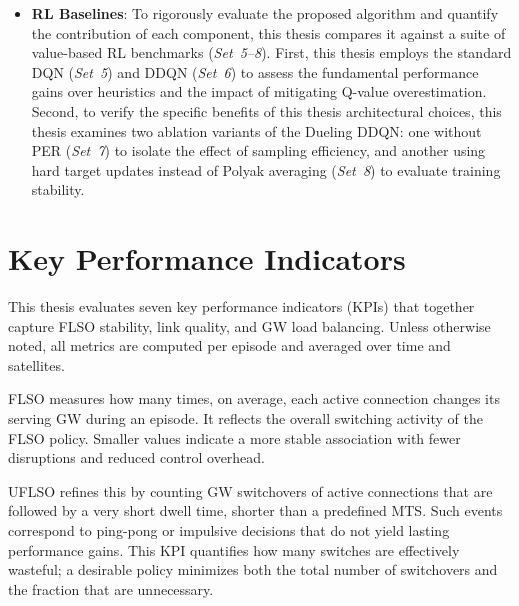 \begin{itemize}
    \item \textbf{RL Baselines}: To rigorously evaluate the proposed algorithm and quantify the contribution of each component, this thesis compares it against a suite of value-based RL benchmarks (\textit{Set~5--8}). First, this thesis employs the standard DQN (\textit{Set~5}) and DDQN (\textit{Set~6}) to assess the fundamental performance gains over heuristics and the impact of mitigating Q-value overestimation. Second, to verify the specific benefits of this thesis architectural choices, this thesis examines two ablation variants of the Dueling DDQN: one without PER (\textit{Set~7}) to isolate the effect of sampling efficiency, and another using hard target updates instead of Polyak averaging (\textit{Set~8}) to evaluate training stability.
\end{itemize}


\section{Key Performance Indicators}
\quad This thesis evaluates seven key performance indicators (KPIs) that together capture FLSO stability, link quality, and GW load balancing. Unless otherwise noted, all metrics are computed per episode and averaged over time and satellites.

FLSO measures how many times, on average, each active connection changes its serving GW during an episode. It reflects the overall switching activity of the FLSO policy. Smaller values indicate a more stable association with fewer disruptions and reduced control overhead.

UFLSO refines this by counting GW switchovers of active connections that are followed by a very short dwell time, shorter than a predefined MTS. Such events correspond to ping-pong or impulsive decisions that do not yield lasting performance gains. This KPI quantifies how many switches are effectively wasteful; a desirable policy minimizes both the total number of switchovers and the fraction that are unnecessary.

